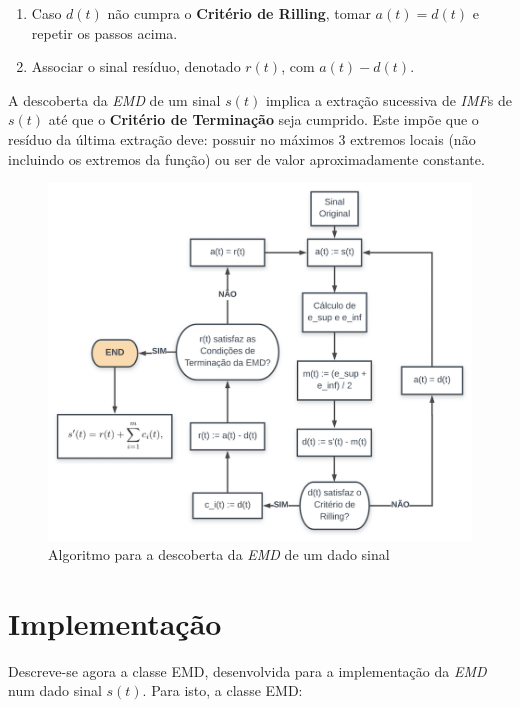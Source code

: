\documentclass[letterpaper]{article}
\begin{document}
\begin{multicols}{2}
\begin{enumerate}[label = \textbf{(\arabic*)} ]
    \item Caso $ d(t) $ não cumpra o \textbf{Critério de Rilling}, tomar $ a(t) = d(t) $ e repetir os passos acima.
    
    \item Associar o sinal resíduo, denotado $ r(t) $, com $ a(t) - d(t)$.
    
\end{enumerate}

\par A descoberta da \textit{EMD} de um sinal $ s(t) $ implica a extração sucessiva de \textit{IMF}s de $ s(t) $ até que o \textbf{Critério de Terminação} seja cumprido. Este impõe que o resíduo da última extração deve: possuir no máximos 3 extremos locais (não incluindo os extremos da função) ou ser de valor aproximadamente constante.

\begin{center}
\begin{figure}[H]
\centering
    \includegraphics[width=\columnwidth]{esquema.png}
    \caption{Algoritmo para a descoberta da \textit{EMD} de um dado sinal}
    \label{fig:esquema}
\end{figure}
\end{center}

\section{Implementação}
\label{sec:implement}

\par Descreve-se agora a classe \textsc{EMD}, desenvolvida para a implementação da \textit{EMD} num dado sinal $ s(t) $. Para isto, a classe \textsc{EMD}:


\end{multicols}
\end{document}

